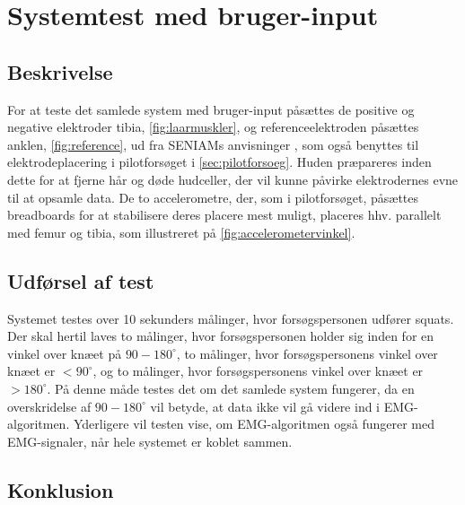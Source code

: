 \section{Systemtest med bruger-input}

\subsection{Beskrivelse}
For at teste det samlede system med bruger-input påsættes de positive og negative elektroder tibia, \autoref{fig:laarmuskler}, og referenceelektroden påsættes anklen, \autoref{fig:reference}, ud fra SENIAMs anvisninger \citep{seniam2016}, som også benyttes til elektrodeplacering i pilotforsøget i \autoref{sec:pilotforsoeg}. Huden præpareres inden dette for at fjerne hår og døde hudceller, der vil kunne påvirke elektrodernes evne til at opsamle data. 
De to accelerometre, der, som i pilotforsøget, påsættes breadboards for at stabilisere deres placere mest muligt, placeres hhv. parallelt med femur og tibia, som illustreret på \autoref{fig:accelerometervinkel}.

\subsection{Udførsel af test}
Systemet testes over 10 sekunders målinger, hvor forsøgspersonen udfører squats. Der skal hertil laves to målinger, hvor forsøgspersonen holder sig inden for en vinkel over knæet på $90-180^{\circ}$, to målinger, hvor forsøgspersonens vinkel over knæet er $<90^{\circ}$, og to målinger, hvor forsøgspersonens vinkel over knæet er $>180^{\circ}$. På denne måde testes det om det samlede system fungerer, da en overskridelse af $90-180^{\circ}$ vil betyde, at data ikke vil gå videre ind i EMG-algoritmen. Yderligere vil testen vise, om EMG-algoritmen også fungerer med EMG-signaler, når hele systemet er koblet sammen. 

\subsection{Konklusion}
